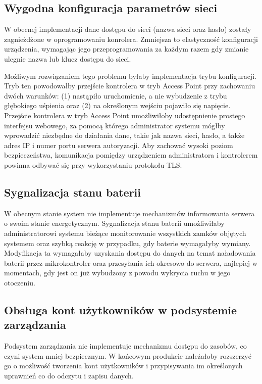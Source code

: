         \subsection{Wygodna konfiguracja parametrów sieci}

            W obecnej implementacji dane dostępu do sieci (nazwa sieci oraz hasło) zostały zagnieżdżone w oprogramowaniu konrolera. Zmniejsza to elastyczność konfiguracji urządzenia, wymagając jego przeprogramowania za każdym razem gdy zmianie ulegnie nazwa lub klucz dostępu do sieci.

            Możliwym rozwiązaniem tego problemu byłaby implementacja trybu konfiguracji. Tryb ten powodowałby przejście kontrolera w tryb Access Point przy zachowaniu dwóch warunków: (1) nastąpiło uruchomienie, a nie wybudzenie z trybu głębokiego uśpienia oraz (2) na określonym wejściu pojawiło się napięcie. Przejście kontrolera w tryb Access Point umożliwiłoby udostępnienie prostego interfejsu webowego, za pomocą którego administrator systemu mógłby wprowadzić niezbędne do działania dane, takie jak nazwa sieci, hasło, a także adres IP i numer portu serwera autoryzacji. Aby zachować wysoki poziom bezpieczeństwa, komunikacja pomiędzy urządzeniem administratora i kontrolerem powinna odbywać się przy wykorzystaniu protokołu TLS.

        \subsection{Sygnalizacja stanu baterii}

            W obecnym stanie system nie implementuje mechanizmów informowania serwera o swoim stanie energetycznym.
            Sygnalizacja stanu baterii umożliwiłaby administratorowi systemu bieżące monitorowanie wszystkich zamków objętych systemem oraz szybką reakcję w przypadku, gdy baterie wymagałyby wymiany. Modyfikacja ta wymagałaby uzyskania dostępu do danych na temat naładowania baterii przez mikrokontroler oraz przesyłania ich okresowo do serwera, najlepiej w momentach, gdy jest on już wybudzony z powodu wykrycia ruchu w jego otoczeniu.

        \subsection{Obsługa kont użytkowników w podsystemie zarządzania}
            Podsystem zarządzania nie implementuje mechanizmu dostępu do zasobów, co czyni system mniej bezpiecznym. W końcowym produkcie należałoby rozszerzyć go o możliwość tworzenia kont użytkowników i przypisywania im określonych uprawnień co do odczytu i zapisu danych.
